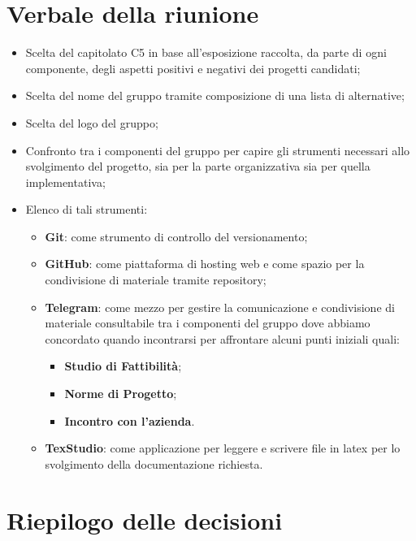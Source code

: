 \section{Verbale della riunione}
\begin{itemize}
	\item Scelta del capitolato C5 in base all'esposizione raccolta, da parte di ogni componente, 
		  degli aspetti positivi e negativi dei progetti candidati;
	\item Scelta del nome del gruppo tramite composizione di una lista di alternative;
	\item Scelta del logo del gruppo;
	\item Confronto tra i componenti del gruppo per capire gli strumenti necessari allo svolgimento del progetto, 
		  sia per la parte organizzativa sia per quella implementativa;
	\item Elenco di tali strumenti:
		\begin{itemize}
			\item \textbf{Git}: come strumento di controllo del versionamento;
			\item \textbf{GitHub}: come piattaforma di hosting web e come spazio per la condivisione di materiale tramite repository;
			\item \textbf{Telegram}: come mezzo per gestire la comunicazione e condivisione di materiale consultabile tra i componenti
			del gruppo dove abbiamo concordato quando incontrarsi per affrontare alcuni punti iniziali quali:
			\begin{itemize}
				\item \textbf{Studio di Fattibilità};
				\item \textbf{Norme di Progetto};
				\item \textbf{Incontro con l'azienda}.
			\end{itemize}
			\item \textbf{TexStudio}: come applicazione per leggere e scrivere file in latex per lo svolgimento della documentazione richiesta.
		\end{itemize} 
\end{itemize} 
\pagebreak
\section{Riepilogo delle decisioni}

	
